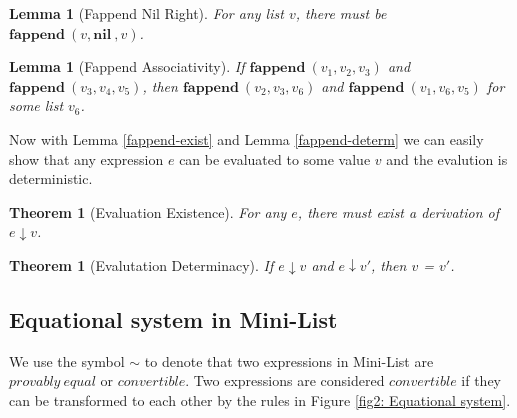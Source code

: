 \documentclass[a4paper]{article}
\newtheorem{thm}[equation]{Theorem}
\newtheorem{lem}[equation]{Lemma}
\theoremstyle{plain}
\def\DA{\downarrow}
\def\*#1{\mathbf{#1}\ }
\begin{document}
\begin{lem}[Fappend Nil Right]
	 For any list $v$, there must be $\*{fappend} ( v, \*{nil} ,v) $. 
	 \label{fappend-nil-r} 
\end{lem}

\begin{lem}[Fappend Associativity]
	If $\*{fappend} (v_1 ,v_2,v_3)$ and $\*{fappend}(v_3,v_4,v_5)$, then $\*{fappend}(v_2,v_3,v_6)$ and $\*{fappend} (v_1,v_6,v_5)$ for some list $v_6$.
	\label{fappend-asso}
\end{lem}

Now with Lemma \ref{fappend-exist} and Lemma \ref{fappend-determ} we can easily show that any expression $e$ can be evaluated to some value $v$ and the evalution is deterministic. 
\begin{thm} [Evaluation Existence]
	For any $e$, there must exist a derivation of $e \DA v $.
	\label{Eval-Exist}
\end{thm}

\begin{thm} [Evalutation Determinacy]
	If $e \DA v $ and $e \DA v'$, then $v$ = $v'$.
	\label{Eval-determ}
\end{thm}

\subsection{Equational system in Mini-List}
We use the symbol $\sim$ to denote that two expressions in Mini-List are $provably \ equal$ or $convertible$. Two expressions are considered $convertible$ if they can be transformed to each other by the rules in Figure \ref{fig2: Equational system}. 
\end{document}
